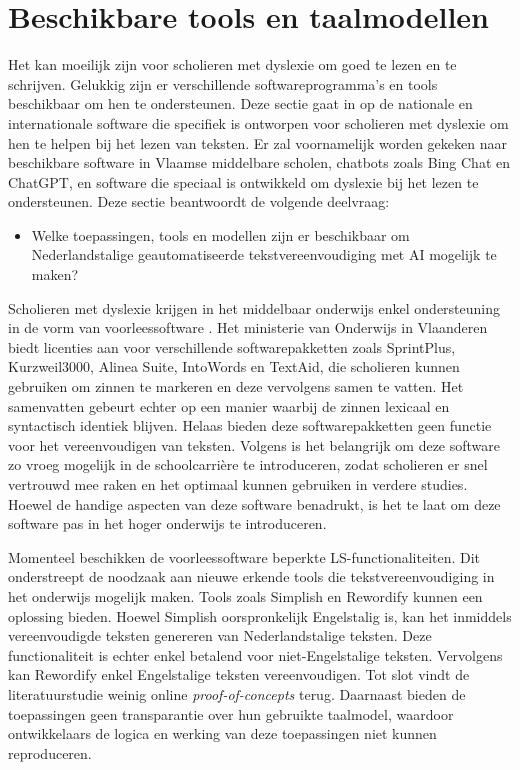 \section{Beschikbare tools en taalmodellen}
\label{sec:beschikbare-tools-en-taalmodellen}

Het kan moeilijk zijn voor scholieren met dyslexie om goed te lezen en te schrijven. Gelukkig zijn er verschillende softwareprogramma's en tools beschikbaar om hen te ondersteunen. Deze sectie gaat in op de nationale en internationale software die specifiek is ontworpen voor scholieren met dyslexie om hen te helpen bij het lezen van teksten.  Er zal voornamelijk worden gekeken naar beschikbare software in Vlaamse middelbare scholen, chatbots zoals Bing Chat en ChatGPT, en software die speciaal is ontwikkeld om dyslexie bij het lezen te ondersteunen. Deze sectie beantwoordt de volgende deelvraag: 

\begin{itemize}
	\item Welke toepassingen, tools en modellen zijn er beschikbaar om Nederlandstalige geautomatiseerde tekstvereenvoudiging met AI mogelijk te maken?
\end{itemize}

\medspace

Scholieren met dyslexie krijgen in het middelbaar onderwijs enkel ondersteuning in de vorm van voorleessoftware \autocite{DeCraemer2018, OnderwijsVlaanderen2023}. Het ministerie van Onderwijs in Vlaanderen biedt licenties aan voor verschillende softwarepakketten zoals SprintPlus, Kurzweil3000, Alinea Suite, IntoWords en TextAid, die scholieren kunnen gebruiken om zinnen te markeren en deze vervolgens samen te vatten. Het samenvatten gebeurt echter op een manier waarbij de zinnen lexicaal en syntactisch identiek blijven. Helaas bieden deze softwarepakketten geen functie voor het vereenvoudigen van teksten. Volgens \textcite{Tops2018} is het belangrijk om deze software zo vroeg mogelijk in de schoolcarrière te introduceren, zodat scholieren er snel vertrouwd mee raken en het optimaal kunnen gebruiken in verdere studies. Hoewel \textcite{Tops2018} de handige aspecten van deze software benadrukt, is het te laat om deze software pas in het hoger onderwijs te introduceren.

\medspace

Momenteel beschikken de voorleessoftware beperkte LS-functionaliteiten. Dit onderstreept de noodzaak aan nieuwe erkende tools die tekstvereenvoudiging in het onderwijs mogelijk maken. Tools zoals Simplish en Rewordify kunnen een oplossing bieden. Hoewel Simplish oorspronkelijk Engelstalig is, kan het inmiddels vereenvoudigde teksten genereren van Nederlandstalige teksten. Deze functionaliteit is echter enkel betalend voor niet-Engelstalige teksten. Vervolgens kan Rewordify enkel Engelstalige teksten vereenvoudigen. Tot slot vindt de literatuurstudie weinig online \textit{proof-of-concepts} terug. Daarnaast bieden de toepassingen geen transparantie over hun gebruikte taalmodel, waardoor ontwikkelaars de logica en werking van deze toepassingen niet kunnen reproduceren. 

